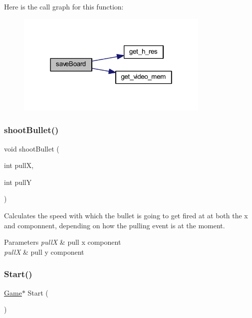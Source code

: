 Here is the call graph for this function\+:
\nopagebreak
\begin{figure}[H]
\begin{center}
\leavevmode
\includegraphics[width=262pt]{group__game_ga0cf89070294bbf27c335ebf047e0f1f6_cgraph}
\end{center}
\end{figure}
\mbox{\label{group__game_ga8aa45a2e3dda0d09a4002eb399e587a9}} 
\subsubsection{\texorpdfstring{shootBullet()}{shootBullet()}}
{\footnotesize\ttfamily void shoot\+Bullet (\begin{DoxyParamCaption}\item[{int}]{pullX,  }\item[{int}]{pullY }\end{DoxyParamCaption})}



Calculates the speed with which the bullet is going to get fired at at both the x and componnent, depending on how the pulling event is at the moment. 


\begin{DoxyParams}{Parameters}
{\em pullX} & pull x component \\
\hline
{\em pullX} & pull y component \\
\hline
\end{DoxyParams}
\mbox{\label{group__game_gaaae55be55be73d9c3073893b52530b32}} 
\subsubsection{\texorpdfstring{Start()}{Start()}}
{\footnotesize\ttfamily \mbox{\hyperlink{struct_game}{Game}}$\ast$ Start (\begin{DoxyParamCaption}{ }\end{DoxyParamCaption})}

